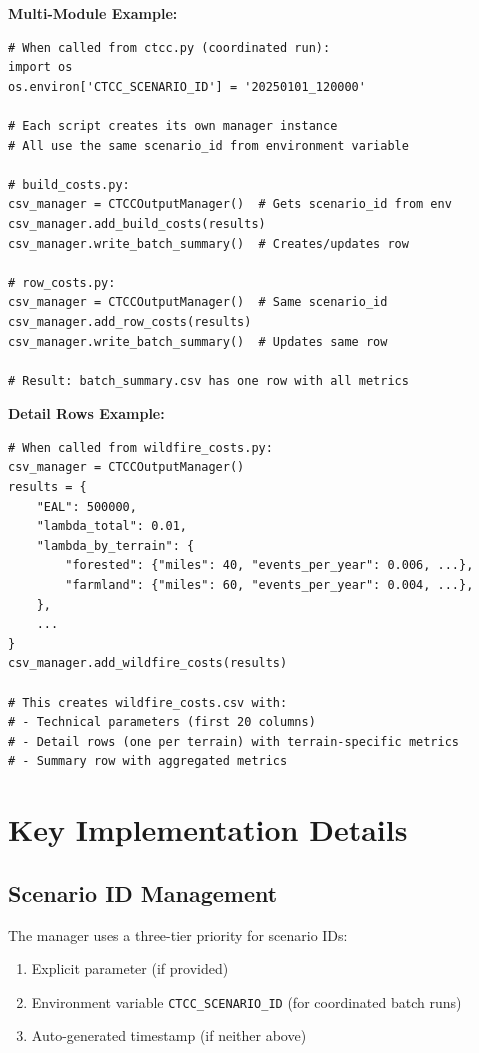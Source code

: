 \documentclass[ctcc_full_documentation.tex]{subfiles}
\begin{document}
\textbf{Multi-Module Example:}

\begin{lstlisting}
# When called from ctcc.py (coordinated run):
import os
os.environ['CTCC_SCENARIO_ID'] = '20250101_120000'

# Each script creates its own manager instance
# All use the same scenario_id from environment variable

# build_costs.py:
csv_manager = CTCCOutputManager()  # Gets scenario_id from env
csv_manager.add_build_costs(results)
csv_manager.write_batch_summary()  # Creates/updates row

# row_costs.py:
csv_manager = CTCCOutputManager()  # Same scenario_id
csv_manager.add_row_costs(results)
csv_manager.write_batch_summary()  # Updates same row

# Result: batch_summary.csv has one row with all metrics
\end{lstlisting}

\textbf{Detail Rows Example:}

\begin{lstlisting}
# When called from wildfire_costs.py:
csv_manager = CTCCOutputManager()
results = {
    "EAL": 500000,
    "lambda_total": 0.01,
    "lambda_by_terrain": {
        "forested": {"miles": 40, "events_per_year": 0.006, ...},
        "farmland": {"miles": 60, "events_per_year": 0.004, ...},
    },
    ...
}
csv_manager.add_wildfire_costs(results)

# This creates wildfire_costs.csv with:
# - Technical parameters (first 20 columns)
# - Detail rows (one per terrain) with terrain-specific metrics
# - Summary row with aggregated metrics
\end{lstlisting}

\section{Key Implementation Details}

\subsection{Scenario ID Management}

The manager uses a three-tier priority for scenario IDs:
\begin{enumerate}
    \item Explicit parameter (if provided)
    \item Environment variable \texttt{CTCC\_SCENARIO\_ID} (for coordinated batch runs)
    \item Auto-generated timestamp (if neither above)
\end{enumerate}
\end{document}
